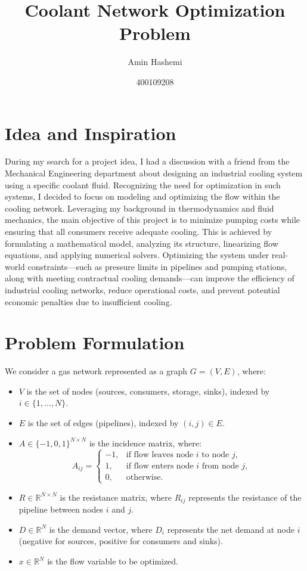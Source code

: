 \documentclass{article}
\begin{document}
\title{Coolant Network Optimization Problem}
\author{Amin Hashemi}
\date{400109208}
\maketitle

\section{Idea and Inspiration}
During my search for a project idea, I had a discussion with a friend from the Mechanical Engineering department about designing an industrial cooling system using a specific coolant fluid. Recognizing the need for optimization in such systems, I decided to focus on modeling and optimizing the flow within the cooling network. Leveraging my background in thermodynamics and fluid mechanics, the main objective of this project is to minimize pumping costs while ensuring that all consumers receive adequate cooling. This is achieved by formulating a mathematical model, analyzing its structure, linearizing flow equations, and applying numerical solvers. Optimizing the system under real-world constraints—such as pressure limits in pipelines and pumping stations, along with meeting contractual cooling demands—can improve the efficiency of industrial cooling networks, reduce operational costs, and prevent potential economic penalties due to insufficient cooling.

\section{Problem Formulation}
We consider a gas network represented as a graph \( G = (V, E) \), where:
\begin{itemize}
    \item \( V \) is the set of nodes (sources, consumers, storage, sinks), indexed by \( i \in \{1, \dots, N\} \).
    \item \( E \) is the set of edges (pipelines), indexed by \( (i, j) \in E \).
    \item \( A \in \{-1, 0, 1\}^{N \times N} \) is the incidence matrix, where:
    \[
    A_{ij} =
    \begin{cases}
    -1, & \text{if flow leaves node } i \text{ to node } j, \\
    1, & \text{if flow enters node } i \text{ from node } j, \\
    0, & \text{otherwise}.
    \end{cases}
    \]
    \item \( R \in \mathbb{R}^{N \times N} \) is the resistance matrix, where \( R_{ij} \) represents the resistance of the pipeline between nodes \( i \) and \( j \).
    \item \( D \in \mathbb{R}^N \) is the demand vector, where \( D_i \) represents the net demand at node \( i \) (negative for sources, positive for consumers and sinks).
    \item \( x \in \mathbb{R}^N \) is the flow variable to be optimized.
\end{itemize}
\end{document}
